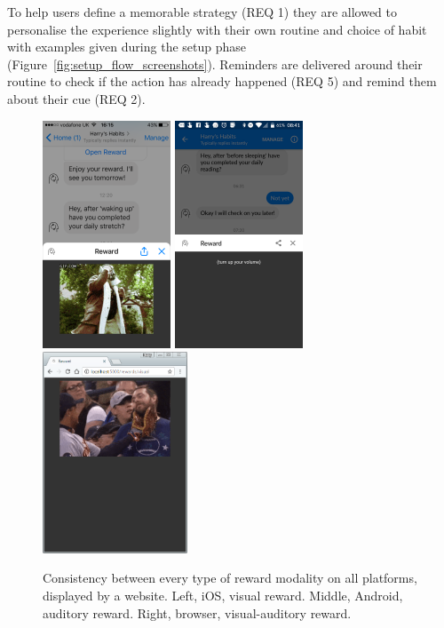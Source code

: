 To help users define a memorable strategy (REQ 1) they are allowed to personalise the experience slightly with their own routine and choice of habit with examples given during the setup phase (Figure~\ref{fig:setup_flow_screenshots}). Reminders are delivered around their routine to check if the action has already happened (REQ 5) and remind them about their cue (REQ 2).

\begin{figure}[H]
  \centering
  \includegraphics[width=1.5in]{../resources/design/reward-visual-2.png}
  \hspace{10px}
  \includegraphics[width=1.5in]{../resources/design/reward-audio.png}
  \hspace{10px}
  \includegraphics[width=1.7in]{../resources/design/reward-desktop-visual.png}
  \caption{Consistency between every type of reward modality on all platforms, displayed by a website. Left, iOS, visual reward. Middle, Android, auditory reward. Right, browser, visual-auditory reward.}
  \label{fig:rewards_consistency}
\end{figure}


